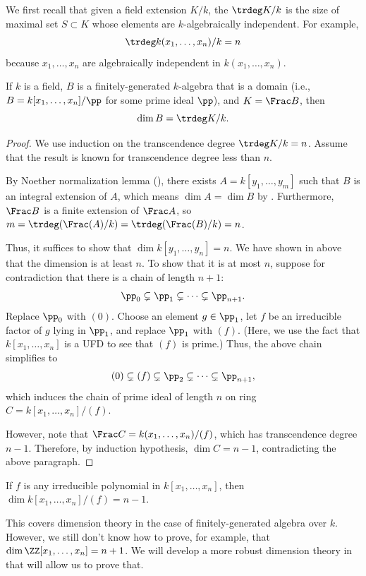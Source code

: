 We first recall that given a field extension
$K/k$, the  $\trdeg K/k$ 
is the size of
maximal set $S\subset K$ whose elements are 
$k$-algebraically independent.
For example, 
$$\trdeg k(x_1,\dots,x_n)/k = n$$
because $x_1,\dots,x_n$ are algebraically independent
in $k(x_1,\dots,x_n)$.
\begin{theorem}
    \label{thm:dim_transcendence}
    If $k$ is a field, $B$ is a finitely-generated $k$-algebra
    that is a domain
    (i.e., $B=k[x_1,\dots,x_n]/\pp$ for some prime ideal $\pp$),
    and $K=\Frac B$, then 
    $$\dim B = \trdeg K/k.$$
\end{theorem}
\begin{proof}
    We use induction on the transcendence degree $\trdeg K/k=n$.
    Assume that the result is known for transcendence
    degree less than $n$.

    By Noether normalization lemma (),
    there exists $A=k[y_1,\dots,y_m]$ such that 
    $B$ is an integral extension of $A$,
    which means $\dim A=\dim B$ by .
    Furthermore, $\Frac B$ is a finite extension of $\Frac A$, 
    so $m = \trdeg(\Frac(A)/k) =\trdeg(\Frac(B)/k)= n$.

    Thus, it suffices to show that $\dim k[y_1,\dots,y_n]=n$.
    We have shown in  above that 
    the dimension is at least $n$.
    To show that it is at most $n$, suppose for contradiction
    that there is a chain of length $n+1$:
    $$\pp_0 \subsetneq \pp_1 \subsetneq \dots \subsetneq \pp_{n+1}.$$
    Replace $\pp_0$ with $(0)$. Choose an element $g\in \pp_1$,
    let $f$ be an irreducible factor of $g$ lying in $\pp_1$,
    and replace $\pp_1$ with $(f)$. (Here, we use the fact that
    $k[x_1,\dots,x_n]$ is a UFD to see  that $(f)$ is prime.)
    Thus, the above chain simplifies to
    $$(0) \subsetneq (f)\subsetneq \pp_2
    \subsetneq \dots \subsetneq \pp_{n+1},$$
    which induces the chain of prime ideal of length $n$ on ring 
    $C = k[x_1,\dots,x_n]/(f)$.

    However, note that $\Frac C = k(x_1,\dots,x_n)/(f)$,
    which has transcendence degree $n-1$.
    Therefore, by induction hypothesis, $\dim C = n-1$,
    contradicting the above paragraph.
\end{proof}
\begin{example}
    If $f$ is any irreducible polynomial in $k[x_1,\dots,x_n]$,
    then $\dim k[x_1,\dots,x_n]/(f) = n-1$.
\end{example}
This covers dimension theory in the case of 
finitely-generated algebra over $k$. 
However, we still don't know how to prove, for example,
that $\dim \ZZ[x_1,\dots,x_n] = n+1$.
We will develop a more robust dimension theory in 
 that will allow us to prove that.
%
%
